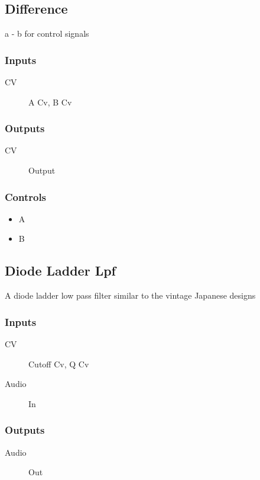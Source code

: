 \subsection{Difference}

a - b for control signals



\subsubsection{Inputs}
\begin{description}
\item [CV] A Cv, B Cv
\end{description}

\subsubsection{Outputs}
\begin{description}
\item [CV] Output
\end{description}

\subsubsection{Controls}
\begin{itemize}
\item A
\item B
\end{itemize}

\subsection{Diode Ladder Lpf}

A diode ladder low pass filter similar to the vintage Japanese designs



\subsubsection{Inputs}
\begin{description}
\item [CV] Cutoff Cv, Q Cv
\item [Audio] In
\end{description}

\subsubsection{Outputs}
\begin{description}
\item [Audio] Out
\end{description}

